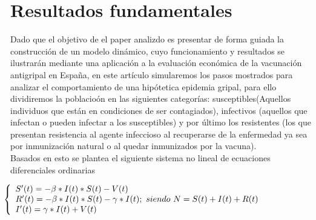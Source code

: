 \documentclass{wscpaperproc}
\theoremstyle{wsc}
\begin{document}
\section{Resultados fundamentales}
Dado que el objetivo de el paper analizdo es presentar de forma guiada la
construcción de un modelo dinámico, cuyo funcionamiento y resultados se ilustrarán mediante una aplicación a la evaluación
económica de la vacunación antigripal en España, en este art\'iculo simularemos los pasos
mostrados para analizar el comportamiento de una hip\'otetica epidemia gripal,
para ello dividiremos la poblacio\'on en las siguientes categor\'ias:
susceptibles(Aquellos individuos que están en condiciones de ser contagiados),
infectivos (aquellos que infectan o pueden
infectar a los susceptibles) y por último los resistentes (los que presentan
resistencia al agente infeccioso al recuperarse de la enfermedad ya sea por inmunización natural
o al quedar inmunizados por la vacuna).
\\
Basados en esto se plantea el siguiente sistema no lineal de ecuaciones diferenciales ordinarias

\begin{equation}
\hspace{-7em}
\begin{aligned}
\left\{
\begin{array}{l}
S'(t) = -\beta*I(t)*S(t)-V(t) \\
R'(t) = -\beta*I(t)*S(t)- \gamma*I(t); \ siendo \ N = S(t)+I(t)+R(t)\\
I'(t) = \gamma*I(t)+ V(t)
\end{array}
\right.
\end{aligned}
\end{equation}
\end{document}
